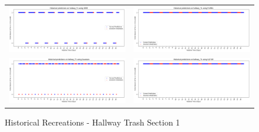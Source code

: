 \begin{figure}
  \begin{tabular}{cc}
    {\includegraphics[width = 3in]{images/results/Historical_hallway_T1_DMM.png}} &
    {\includegraphics[width = 3in]{images/results/Historical_hallway_T1_FreMEn.png}} \\
    {\includegraphics[width = 3in]{images/results/Historical_hallway_T1_Gaussian.png}} &
    {\includegraphics[width = 3in]{images/results/Historical_hallway_T1_HyT-EM.png}} \\
  \end{tabular}
  \caption{Historical Recreations - Hallway Trash Section 1}
\end{figure}

